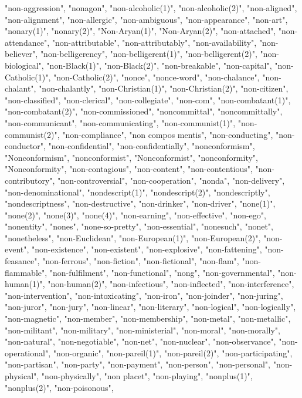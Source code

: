 "non-aggression",
"nonagon",
"non-alcoholic(1)",
"non-alcoholic(2)",
"non-aligned",
"non-alignment",
"non-allergic",
"non-ambiguous",
"non-appearance",
"non-art",
"nonary(1)",
"nonary(2)",
"Non-Aryan(1)",
"Non-Aryan(2)",
"non-attached",
"non-attendance",
"non-attributable",
"non-attributably",
"non-availability",
"non-believer",
"non-belligerency",
"non-belligerent(1)",
"non-belligerent(2)",
"non-biological",
"non-Black(1)",
"non-Black(2)",
"non-breakable",
"non-capital",
"non-Catholic(1)",
"non-Catholic(2)",
"nonce",
"nonce-word",
"non-chalance",
"non-chalant",
"non-chalantly",
"non-Christian(1)",
"non-Christian(2)",
"non-citizen",
"non-classified",
"non-clerical",
"non-collegiate",
"non-com",
"non-combatant(1)",
"non-combatant(2)",
"non-commissioned",
"noncommittal",
"noncommittally",
"non-communicant",
"non-communicating",
"non-communist(1)",
"non-communist(2)",
"non-compliance",
"non compos mentis",
"non-conducting",
"non-conductor",
"non-confidential",
"non-confidentially",
"nonconformism",
"Nonconformism",
"nonconformist",
"Nonconformist",
"nonconformity",
"Nonconformity",
"non-contagious",
"non-content",
"non-contentious",
"non-contributory",
"non-controversial",
"non-cooperation",
"nonda",
"non-delivery",
"non-denominational",
"nondescript(1)",
"nondescript(2)",
"nondescriptly",
"nondescriptness",
"non-destructive",
"non-drinker",
"non-driver",
"none(1)",
"none(2)",
"none(3)",
"none(4)",
"non-earning",
"non-effective",
"non-ego",
"nonentity",
"nones",
"none-so-pretty",
"non-essential",
"nonesuch",
"nonet",
"nonetheless",
"non-Euclidean",
"non-European(1)",
"non-European(2)",
"non-event",
"non-existence",
"non-existent",
"non-explosive",
"non-fattening",
"non-feasance",
"non-ferrous",
"non-fiction",
"non-fictional",
"non-flam",
"non-flammable",
"non-fulfilment",
"non-functional",
"nong",
"non-governmental",
"non-human(1)",
"non-human(2)",
"non-infectious",
"non-inflected",
"non-interference",
"non-intervention",
"non-intoxicating",
"non-iron",
"non-joinder",
"non-juring",
"non-juror",
"non-jury",
"non-linear",
"non-literary",
"non-logical",
"non-logically",
"non-magnetic",
"non-member",
"non-membership",
"non-metal",
"non-metallic",
"non-militant",
"non-military",
"non-ministerial",
"non-moral",
"non-morally",
"non-natural",
"non-negotiable",
"non-net",
"non-nuclear",
"non-observance",
"non-operational",
"non-organic",
"non-pareil(1)",
"non-pareil(2)",
"non-participating",
"non-partisan",
"non-party",
"non-payment",
"non-person",
"non-personal",
"non-physical",
"non-physically",
"non placet",
"non-playing",
"nonplus(1)",
"nonplus(2)",
"non-poisonous",
